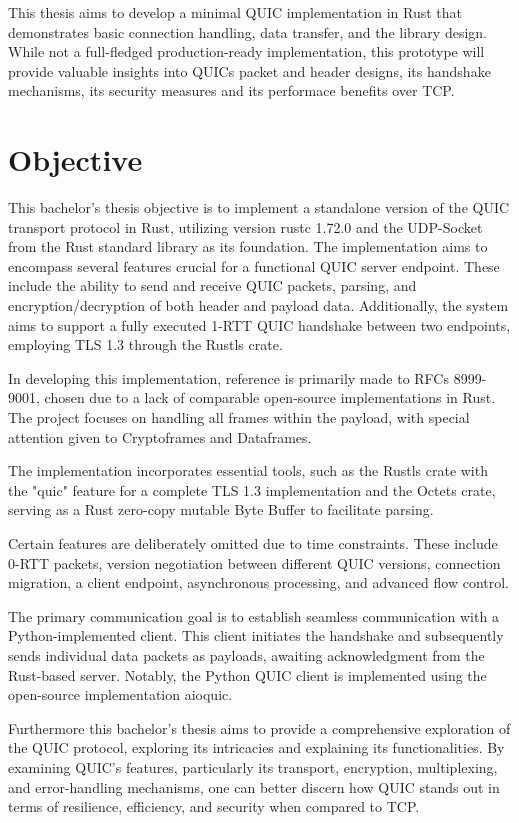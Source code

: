 This thesis aims to develop a minimal QUIC implementation in Rust that demonstrates basic connection
handling, data transfer, and the library design. While not a full-fledged production-ready
implementation, this prototype will provide valuable insights into QUICs packet and header designs,
its handshake mechanisms, its security measures and its performace benefits over TCP.

\section{Objective}

This bachelor's thesis objective is to implement a standalone version of the QUIC transport protocol in Rust,
utilizing version rustc 1.72.0 and the UDP-Socket from the Rust standard library as its foundation. The
implementation aims to encompass several features crucial for a functional QUIC server endpoint. These include
the ability to send and receive QUIC packets, parsing, and encryption/decryption of both header and payload data.
Additionally, the system aims to support a fully executed 1-RTT QUIC handshake between two endpoints, employing
TLS 1.3 through the Rustls crate.

In developing this implementation, reference is primarily made to RFCs 8999-9001, chosen due to a lack of
comparable open-source implementations in Rust. The project focuses on handling all frames within the payload,
with special attention given to Cryptoframes and Dataframes.

The implementation incorporates essential tools, such as the Rustls crate with the "quic" feature for a
complete TLS 1.3 implementation and the Octets crate, serving as a Rust zero-copy mutable Byte Buffer to
facilitate parsing.

Certain features are deliberately omitted due to time constraints. These include 0-RTT packets, version
negotiation between different QUIC versions, connection migration, a client endpoint, asynchronous processing,
and advanced flow control.

The primary communication goal is to establish seamless communication with a Python-implemented client.
This client initiates the handshake and subsequently sends individual data packets as payloads, awaiting
acknowledgment from the Rust-based server. Notably, the Python QUIC client is implemented using the open-source
implementation aioquic.

Furthermore this bachelor's thesis aims to provide a comprehensive exploration of the QUIC protocol, exploring
its intricacies and explaining its functionalities. By examining QUIC's features, particularly its transport,
encryption, multiplexing, and error-handling mechanisms, one can better discern how QUIC stands out in terms
of resilience, efficiency, and security when compared to TCP.

